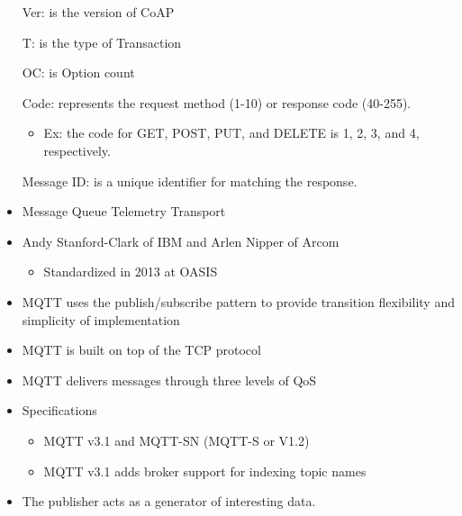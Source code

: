 \hspace*{1.2cm}
\begin{minipage}{\textwidth}
\begin{itemize}
	\item[Ver:] is the version of CoAP
	\item[T:] is the type of Transaction
	\item[OC:] is Option count
	\item[Code:] represents the request method (1-10) or response code (40-255).
		\begin{itemize}
			\item Ex: the code for GET, POST, PUT, and DELETE is 1, 2, 3, and 4, respectively.
		\end{itemize}
	\item[Message ID:] is a unique identifier for matching the response.
\end{itemize}
\end{minipage}

	\begin{itemize}
		\item Message Queue Telemetry Transport
		\item Andy Stanford-Clark of IBM and Arlen Nipper of Arcom
			\begin{itemize}
				\item Standardized in 2013 at OASIS
			\end{itemize}
		\item MQTT uses the publish/subscribe pattern to provide transition flexibility and simplicity of implementation
		\item MQTT is built on top of the TCP protocol
		\item MQTT delivers messages through three levels of QoS
		\item Specifications
			\begin{itemize}
				\item MQTT v3.1 and MQTT-SN (MQTT-S or V1.2)
				\item MQTT v3.1 adds broker support for indexing topic names
			\end{itemize}
		\item The publisher acts as a generator of interesting data.
	\end{itemize}

